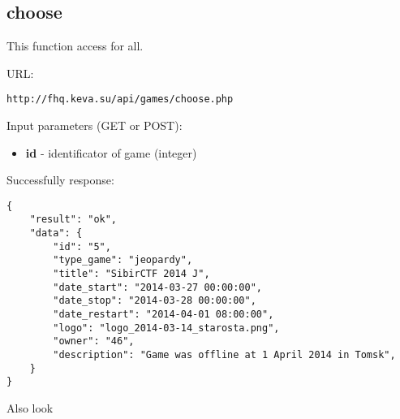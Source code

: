 \subsection{choose}
\par

This function access for all.

URL:
\begin{Verbatim}[frame=single]
http://fhq.keva.su/api/games/choose.php
\end{Verbatim}

Input parameters (GET or POST):
\begin{itemize}
  \item \textbf{id} - identificator of game (integer)
\end{itemize}

Successfully response:  \\
\begin{Verbatim}[frame=single]
{
    "result": "ok",
    "data": {
        "id": "5",
        "type_game": "jeopardy",
        "title": "SibirCTF 2014 J",
        "date_start": "2014-03-27 00:00:00",
        "date_stop": "2014-03-28 00:00:00",
        "date_restart": "2014-04-01 08:00:00",
        "logo": "logo_2014-03-14_starosta.png",
        "owner": "46",
        "description": "Game was offline at 1 April 2014 in Tomsk",
    }
}
\end{Verbatim}

Also look ~
